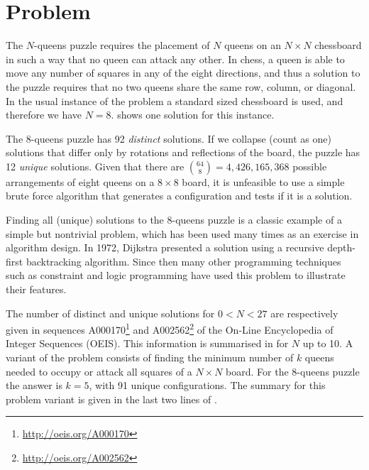 
\section{Problem}

The $N$-queens puzzle requires the placement of $N$ queens on an $N \times N$
chessboard in such a way that no queen can attack any other. In chess, a queen
is able to move any number of squares in any of the eight directions, and thus
a solution to the puzzle requires that no two queens share the same row,
column, or diagonal.  In the usual instance of the problem a standard sized
chessboard is used, and therefore we have $N = 8$.  shows one
solution for this instance.


The 8-queens puzzle has 92 \emph{distinct} solutions. If we collapse (count as
one) solutions that differ only by rotations and reflections of the board, the
puzzle has 12 \emph{unique} solutions. Given that there are $\binom{64}{8} =
4,426,165,368$ possible arrangements of eight queens on a $8 \times 8$ board,
it is unfeasible to use a simple brute force algorithm that generates a
configuration and tests if it is a solution.

Finding all (unique) solutions to the 8-queens puzzle is a classic example of a
simple but nontrivial problem, which has been used many times as an exercise in
algorithm design. In 1972, Dijkstra \cite{Dij72} presented a solution using a
recursive depth-first backtracking algorithm. Since then many other programming
techniques such as constraint and logic programming have used this problem to
illustrate their features.

The number of distinct and unique solutions for $0 < N < 27$ are respectively
given in sequences A000170\footnote{\url{http://oeis.org/A000170}} and
A002562\footnote{\url{http://oeis.org/A002562}} of the On-Line Encyclopedia of
Integer Sequences (OEIS). This information is summarised in 
for $N$ up to 10. A variant of the problem consists of finding the minimum
number of $k$ queens needed to occupy or attack all squares of a $N \times N$
board. For the 8-queens puzzle the answer is $k = 5$, with 91  unique
configurations. The summary for this problem variant is given in the last two
lines of .

